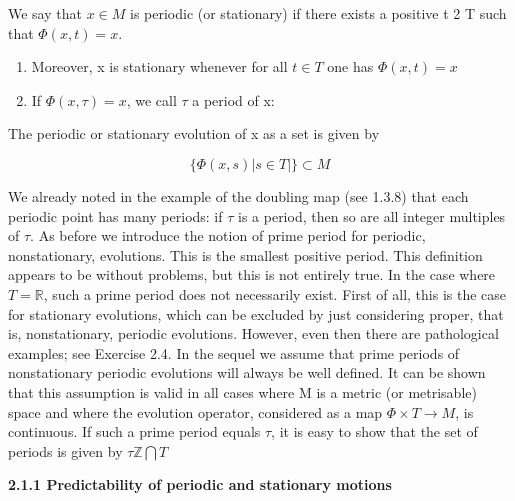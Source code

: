 \documentclass{article}
\begin{document}
\hfill

We say that $x \in M$ is periodic (or stationary) if there exists a positive t 2 T such
that $\Phi(x,t) = x$.

\begin{enumerate}
\item Moreover, x is stationary whenever for all $t \in T$ one has $\Phi(x,t)=x$
\item If $\Phi(x, \tau)=x$, we call $\tau$ a period of x:
\end{enumerate}

The periodic or stationary evolution of x as a set is given by

\[
\{ \Phi(x,s) | s \in T|\} \subset M
\]

We already noted in the example of the doubling map (see 1.3.8) that each
periodic point has many periods: if $\tau$ is a period, then so are all integer multiples
of $\tau$. As before we introduce the notion of prime period for periodic, nonstationary,
evolutions. This is the smallest positive period. This definition appears to be without
problems, but this is not entirely true. In the case where $T = \mathbb{R}$, such a prime period
does not necessarily exist. First of all, this is the case for stationary evolutions,
which can be excluded by just considering proper, that is, nonstationary, periodic
evolutions. However, even then there are pathological examples; see Exercise 2.4.
In the sequel we assume that prime periods of nonstationary periodic evolutions
will always be well defined. It can be shown that this assumption is valid in all
cases where M is a metric (or metrisable) space and where the evolution operator,
considered as a map $\Phi \times T \to M$, is continuous. If such a prime period equals $\tau$, it is easy to show that the set of periods is given by $\tau\mathbb{Z} \bigcap T$ 

\hfill

\textbf{2.1.1 Predictability of periodic and stationary motions}

\hfill
\end{document}
